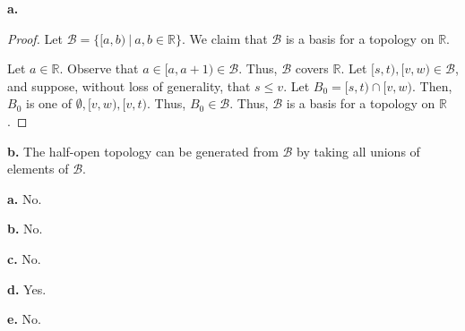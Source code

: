 \documentclass{article}
\newcommand{\R}{\mathbb R}
\begin{document}
\newpage
{}

{\bf a.}
\begin{proof}
    Let $\mathcal B = \{[a,b) ~|~ a,b \in \R\}$. We claim that $\mathcal B$ is a basis for a topology on $\R$.

    Let $a \in \R$.
    Observe that $a \in [a, a+1) \in \mathcal B$.
    Thus, $\mathcal B$ covers $\R$.
    Let $[s, t), [v, w) \in \mathcal B$, and suppose, without loss of generality, that $s \leq v$.
    Let $B_0 = [s, t) \cap [v, w)$.
    Then, $B_0$ is one of $\emptyset, [v,w), [v,t)$.
    Thus, $B_0 \in \mathcal B$.
    Thus, $\mathcal B$ is a basis for a topology on $\R$.
\end{proof}

\medskip
{\bf b.} The half-open topology can be generated from $\mathcal B$ by taking all unions of elements of $\mathcal B$.

\bigskip
{}

{\bf a.} No.

\medskip
{\bf b.} No.

\medskip
{\bf c.} No.

\medskip
{\bf d.} Yes.

\medskip
{\bf e.} No.
\end{document}
